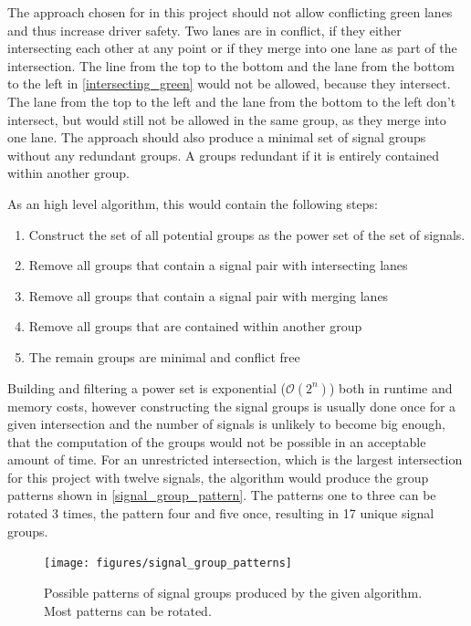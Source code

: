 The approach chosen for in this project should not allow conflicting green lanes and thus increase driver safety. Two lanes are in conflict, if they either intersecting each other at any point or if they merge into one lane as part of the intersection. The line from the top to the bottom and the lane from the bottom to the left in \autoref{intersecting_green} would not be allowed, because they intersect. The lane from the top to the left and the lane from the bottom to the left don't intersect, but would still not be allowed in the same group, as they merge into one lane. The approach should also produce a minimal set of signal groups without any redundant groups. A groups redundant if it is entirely contained within another group.

As an high level algorithm, this would contain the following steps:

\begin{enumerate}
	\item Construct the set of all potential groups as the power set of the set of signals.
	\item Remove all groups that contain a signal pair with intersecting lanes
	\item Remove all groups that contain a signal pair with merging lanes
	\item Remove all groups that are contained within another group
	\item The remain groups are minimal and conflict free
\end{enumerate}

Building and filtering a power set is exponential ($\mathcal{O}(2^n)$) both in runtime and memory costs, however constructing the signal groups is usually done once for a given intersection and the number of signals is unlikely to become big enough, that the computation of the groups would not be possible in an acceptable amount of time. For an unrestricted intersection, which is the largest intersection for this project with twelve signals, the algorithm would produce the group patterns shown in \autoref{signal_group_pattern}. The patterns one to three can be rotated 3 times, the pattern four and five once, resulting in 17 unique signal groups.

\begin{figure}[ht!]
	\centering
	\texttt{[image: figures/signal\_group\_patterns]}
	\caption{Possible patterns of signal groups produced by the given algorithm. Most patterns can be rotated.}
	\label{signal_group_pattern}
\end{figure}


